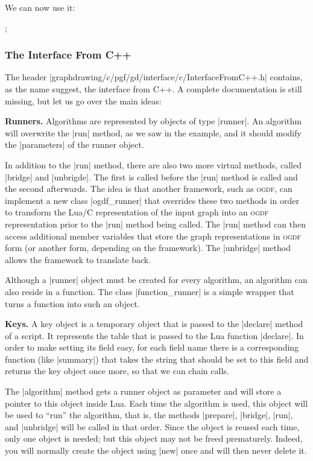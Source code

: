 We can now use it:
%
\begin{codeexample}
\tikz {};
\end{codeexample}


\subsubsection{The Interface From C++}

The header |graphdrawing/c/pgf/gd/interface/c/InterfaceFromC++.h| contains, as
the name suggest, the interface from C++. A complete documentation is still
missing, but let us go over the main ideas:


\medskip
\noindent\textbf{Runners.}
Algorithms are represented by objects of type |runner|. An algorithm will
overwrite the |run| method, as we saw in the example, and it should modify the
|parameters| of the runner object.

In addition to the |run| method, there are also two more virtual methods,
called |bridge| and |unbrigde|. The first is called before the |run| method is
called and the second afterwards. The idea is that another framework, such as
\textsc{ogdf}, can implement a new class |ogdf_runner| that overrides these two
methods in order to transform the Lua/C representation of the input graph into
an \textsc{ogdf} representation prior to the |run| method being called. The
|run| method can then access additional member variables that store the graph
representations in \textsc{ogdf} form (or another form, depending on the
framework). The |unbridge| method allows the framework to translate back.

Although a |runner| object must be created for every algorithm, an algorithm
can also reside in a function. The class |function_runner| is a simple wrapper
that turns a function into such an object.


\medskip
\noindent\textbf{Keys.}
A key object is a temporary object that is passed to the |declare| method of a
script. It represents the table that is passed to the Lua function |declare|.
In order to make setting its field easy, for each field name there is a
corresponding function (like |summary|) that takes the string that should be
set to this field and returns the key object once more, so that we can chain
calls.

The |algorithm| method gets a runner object as parameter and will store a
pointer to this object inside Lua. Each time the algorithm is used, this object
will be used to ``run'' the algorithm, that is, the methods |prepare|,
|bridge|, |run|, and |unbridge| will be called in that order. Since the object
is reused each time, only one object is needed; but this object may not be
freed prematurely. Indeed, you will normally create the object using |new| once
and will then never delete it.

